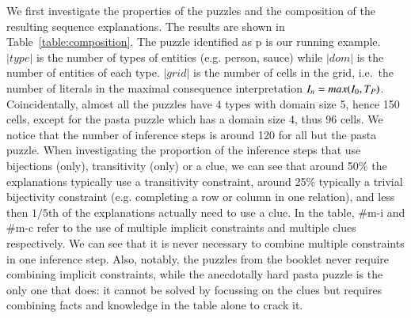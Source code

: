 We first investigate the properties of the puzzles and the composition of the resulting sequence explanations. The results are shown in Table~\ref{table:composition}.
The puzzle identified as p is our running example.
$|type|$ is the number of types of entities (e.g. person, sauce) while $|dom|$ is the number of entities of each type.
$|grid|$ is the number of cells in the grid, i.e.\ the number of literals in the maximal consequence interpretation $I_n=max(I_0,T_P)$.
Coincidentally, almost all the puzzles have 4 types with domain size 5,  hence 150 cells, except for the pasta puzzle which has a domain size 4, thus 96 cells.
We notice that the number of inference steps is around 120 for all but the pasta puzzle.
When investigating the proportion of the inference steps that use bijections (only), transitivity (only) or a clue, we can see that around 50\% the explanations typically use a transitivity constraint, around 25\% typically a trivial bijectivity constraint (e.g. completing a row or column in one relation), and less then $1/5$th of the explanations actually need to use a clue.
In the table, \#m-i and \#m-c refer to the use of multiple implicit constraints and multiple clues respectively.
We can see that it is never necessary to combine multiple constraints in one inference step.
Also, notably, the puzzles from the booklet never require combining implicit constraints, while the anecdotally hard pasta puzzle is the only one that does: it cannot be solved by focussing on the clues but requires combining facts and knowledge in the table alone to crack it.

